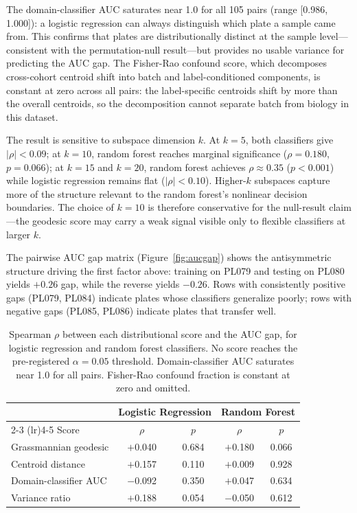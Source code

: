 \documentclass{article}
\begin{document}
The domain-classifier AUC saturates near 1.0 for all 105 pairs (range [0.986, 1.000]): a logistic regression can always distinguish which plate a sample came from. This confirms that plates are distributionally distinct at the sample level---consistent with the permutation-null result---but provides no usable variance for predicting the AUC gap. The Fisher-Rao confound score, which decomposes cross-cohort centroid shift into batch and label-conditioned components, is constant at zero across all pairs: the label-specific centroids shift by more than the overall centroids, so the decomposition cannot separate batch from biology in this dataset.

The result is sensitive to subspace dimension $k$. At $k = 5$, both classifiers give $|\rho| < 0.09$; at $k = 10$, random forest reaches marginal significance ($\rho = 0.180$, $p = 0.066$); at $k = 15$ and $k = 20$, random forest achieves $\rho \approx 0.35$ ($p < 0.001$) while logistic regression remains flat ($|\rho| < 0.10$). Higher-$k$ subspaces capture more of the structure relevant to the random forest's nonlinear decision boundaries. The choice of $k = 10$ is therefore conservative for the null-result claim---the geodesic score may carry a weak signal visible only to flexible classifiers at larger $k$.

The pairwise AUC gap matrix (Figure~\ref{fig:aucgap}) shows the antisymmetric structure driving the first factor above: training on PL079 and testing on PL080 yields $+0.26$ gap, while the reverse yields $-0.26$. Rows with consistently positive gaps (PL079, PL084) indicate plates whose classifiers generalize poorly; rows with negative gaps (PL085, PL086) indicate plates that transfer well.

\begin{table}[t]
\centering
\caption{Spearman $\rho$ between each distributional score and the AUC gap, for logistic regression and random forest classifiers. No score reaches the pre-registered $\alpha = 0.05$ threshold. Domain-classifier AUC saturates near 1.0 for all pairs. Fisher-Rao confound fraction is constant at zero and omitted.}
\label{tab:baselines}
\begin{tabular}{lcccc}
\toprule
 & \multicolumn{2}{c}{Logistic Regression} & \multicolumn{2}{c}{Random Forest} \\
\cmidrule(lr){2-3} \cmidrule(lr){4-5}
Score & $\rho$ & $p$ & $\rho$ & $p$ \\
\midrule
Grassmannian geodesic    & $+$0.040 & 0.684 & $+$0.180 & 0.066 \\
Centroid distance        & $+$0.157 & 0.110 & $+$0.009 & 0.928 \\
Domain-classifier AUC    & $-$0.092 & 0.350 & $+$0.047 & 0.634 \\
Variance ratio           & $+$0.188 & 0.054 & $-$0.050 & 0.612 \\
\bottomrule
\end{tabular}
\end{table}
\end{document}
